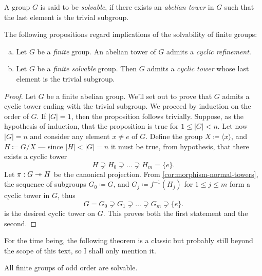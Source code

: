 \begin{definition}
\label{def:solvable-group}
A group \(G\) is said to be \emph{solvable}, if there exists an \emph{abelian
tower} in \(G\) such that the last element is the trivial subgroup.
\end{definition}

\begin{proposition}
\label{prop:finite-grp-cyclic-refinement}
The following propositions regard implications of the solvability of finite
groups:
\begin{enumerate}[(a)]\setlength\itemsep{0em}
\item Let \(G\) be a \emph{finite} group. An abelian tower of \(G\) admits a
  \emph{cyclic refinement}.
\item Let \(G\) be a \emph{finite solvable} group. Then \(G\) admits a
  \emph{cyclic tower} whose last element is the trivial subgroup.
\end{enumerate}
\end{proposition}

\begin{proof}
Let \(G\) be a finite abelian group. We'll set out to prove that \(G\) admits a
cyclic tower ending with the trivial subgroup. We proceed by induction on the
order of \(G\). If \(|G| = 1\), then the proposition follows trivially. Suppose,
as the hypothesis of induction, that the proposition is true for \(1 \leq |G| <
n\). Let now \(|G| = n\) and consider any element \(x \neq e\) of \(G\). Define
the group \(X \coloneq \langle x \rangle\), and \(H \coloneq G/X\) --- since
\(|H| < |G| = n\) it must be true, from hypothesis, that there exists a cyclic
tower
\[
  H \supsetneq H_0 \supsetneq \dots \supsetneq H_m = \{e\}.
\]
Let \(\pi: G \twoheadrightarrow H\) be the canonical projection. From
\cref{cor:morphism-normal-towers}, the sequence of subgroups \(G_0 \coloneq G\),
and \(G_j \coloneq f^{-1}(H_j)\) for \(1 \leq j \leq m\) form a cyclic tower in
\(G\), thus
\[
  G = G_0 \supsetneq G_1 \supsetneq \dots \supsetneq G_m \supsetneq \{e\}.
\]
is the desired cyclic tower on \(G\). This proves both the first statement and
the second.
\end{proof}

For the time being, the following theorem is a classic but probably still beyond
the scope of this text, so I shall only mention it.

\begin{theorem}
\label{thm:feit-thompson}
All finite groups of odd order are solvable.
\end{theorem}

